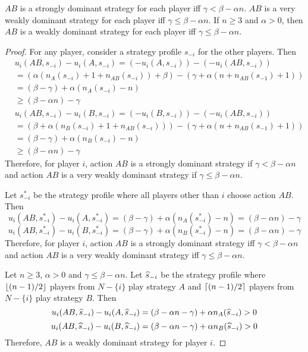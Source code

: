 \begin{theorem}
\label{thm:braess-dse}
$AB$ is a strongly dominant strategy for each player iff $\gamma < \beta - \alpha n$.
$AB$ is a very weakly dominant strategy for each player iff $\gamma \le \beta - \alpha n$.
If $n \ge 3$ and $\alpha > 0$, then $AB$ is a weakly dominant strategy for each player
iff $\gamma \le \beta - \alpha n$.
\end{theorem}
\begin{proof}
For any player, consider a strategy profile $s_{-i}$ for the other players. Then
\begin{align*}
& u_i(AB, s_{-i}) - u_i(A, s_{-i})
= (-u_i(A, s_{-i})) - (-u_i(AB, s_{-i}))
\\ &= (\alpha(n_A(s_{-i}) + 1 + n_{AB}(s_{-i})) + \beta)
    - (\gamma + \alpha(n + n_{AB}(s_{-1}) + 1))
\\ &= (\beta - \gamma) + \alpha(n_A(s_{-i}) - n)
\\ &\ge (\beta - \alpha n) - \gamma
\end{align*}
\begin{align*}
& u_i(AB, s_{-i}) - u_i(B, s_{-i})
= (-u_i(B, s_{-i})) - (-u_i(AB, s_{-i}))
\\ &= (\beta + \alpha(n_B(s_{-i}) + 1 + n_{AB}(s_{-i})))
    - (\gamma + \alpha(n + n_{AB}(s_{-1}) + 1))
\\ &= (\beta - \gamma) + \alpha(n_B(s_{-i}) - n)
\\ &\ge (\beta - \alpha n) - \gamma
\end{align*}
Therefore, for player $i$,
action $AB$ is a strongly dominant strategy if $\gamma < \beta - \alpha n$
and action $AB$ is a very weakly dominant strategy if $\gamma \le \beta - \alpha n$.

Let $s^*_{-i}$ be the strategy profile where
all players other than $i$ choose action $AB$. Then
\[ u_i(AB, s^*_{-i}) - u_i(A, s^*_{-i})
= (\beta - \gamma) + \alpha(n_A(s^*_{-i}) - n)
= (\beta - \alpha n) - \gamma \]
\[ u_i(AB, s^*_{-i}) - u_i(B, s^*_{-i})
= (\beta - \gamma) + \alpha(n_B(s^*_{-i}) - n)
= (\beta - \alpha n) - \gamma \]
Therefore, for player $i$,
action $AB$ is a strongly dominant strategy iff $\gamma < \beta - \alpha n$
and action $AB$ is a very weakly dominant strategy iff $\gamma \le \beta - \alpha n$.

Let $n \ge 3$, $\alpha > 0$ and $\gamma \le \beta - \alpha n$.
Let $\widehat{s}_{-i}$ be the strategy profile where
$\left\lfloor (n-1)/2 \right\rfloor$ players from $N - \{i\}$ play strategy $A$ and
$\left\lceil (n-1)/2 \right\rceil$ players from $N - \{i\}$ play strategy $B$. Then
\[ u_i(AB, \widehat{s}_{-i}) - u_i(A, \widehat{s}_{-i})
= (\beta - \alpha n - \gamma) + \alpha n_A(\widehat{s}_{-i}) > 0 \]
\[ u_i(AB, \widehat{s}_{-i}) - u_i(B, \widehat{s}_{-i})
= (\beta - \alpha n - \gamma) + \alpha n_B(\widehat{s}_{-i}) > 0 \]
Therefore, $AB$ is a weakly dominant strategy for player $i$.
\end{proof}

